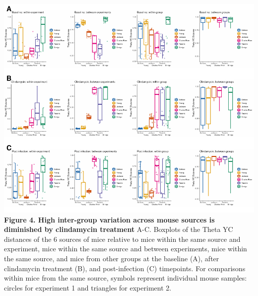 \documentclass[11pt,]{article}
\begin{document}
\includegraphics{figure_4.pdf} \textbf{Figure 4. High inter-group
variation across mouse sources is diminished by clindamycin treatment}
A-C. Boxplots of the Theta YC distances of the 6 sources of mice
relative to mice within the same source and experiment, mice within the
same source and between experiments, mice within the same source, and
mice from other groups at the baseline (A), after clindamycin treatment
(B), and post-infection (C) timepoints. For comparisons within mice from
the same source, symbols represent individual mouse samples: circles for
experiment 1 and triangles for experiment 2.

\newpage
\end{document}

